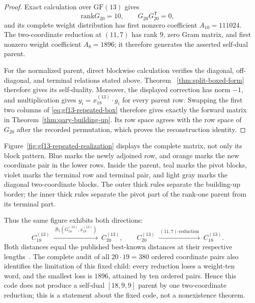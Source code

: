 \documentclass[12pt]{article}
\newcommand{\GF}[1]{\ensuremath{\mathrm{GF}(#1)}}
\newcommand{\rank}{\mathrm{rank}}
\begin{document}
\begin{proof}
Exact calculation over \(\GF{13}\) gives
\[
\rank G_{20}=10,\qquad G_{20}G_{20}^{\mathsf T}=0,
\]
and its complete weight distribution has first nonzero coefficient
\(A_{10}=111024\).  The two-coordinate reduction at \((11,7)\) has rank
\(9\), zero Gram matrix, and first nonzero weight coefficient
\(A_8=1896\); it therefore generates the asserted self-dual parent.

For the normalized parent, direct blockwise calculation verifies the
diagonal, off-diagonal, and terminal relations stated above.  Theorem~
\ref{thm:split-boxed-form} therefore gives its self-duality.  Moreover,
the displayed correction has norm \(-1\), and multiplication gives
\(y_i=x_{18}^{(13)}\cdot g_i\) for every parent row.  Swapping the first two
columns of \eqref{eq:gf13-repeated-box} therefore gives exactly the forward
matrix in Theorem~\ref{thm:qary-building-up}.  Its row space agrees with the
row space of \(G_{20}\) after the recorded permutation, which proves the
reconstruction identity.
\end{proof}

\begin{samepage}
Figure~\ref{fig:gf13-repeated-realization} displays the complete matrix, not
only its block pattern.  Blue marks the newly adjoined row, and orange marks
the new coordinate pair in the lower rows.  Inside the parent, teal marks
the pivot blocks, violet marks the terminal row and terminal pair, and light
gray marks the diagonal two-coordinate blocks.  The outer thick rules
separate the building-up border; the inner thick rules separate the pivot
part of the rank-one parent from its terminal part.

\begin{center}
\centering
{}
\label{fig:gf13-repeated-realization}
\end{center}
\end{samepage}

Thus the same figure exhibits both directions:
\[
C_{18}^{(13)}
\ \xrightarrow{\ \mathcal B_5(G_{18}^{(13)},x_{18}^{(13)})\ }\
C_{20}^{(13)},
\qquad
C_{20}^{(13)}
\ \xrightarrow{\ (11,7)\text{-reduction}\ }\
C_{18}^{(13)}.
\]
Both distances equal the published best-known distances at their respective
lengths~\cite{KimChoi2021,BetsumiyaEtAl}.  The complete audit of all
\(20\cdot19=380\) ordered coordinate
pairs also identifies the limitation of this fixed child: every reduction
loses a weight-ten word, and the smallest loss is \(1896\), attained by ten
ordered pairs.  Hence this code does not produce a self-dual
\([18,9,9]\) parent by one two-coordinate reduction; this is a statement
about the fixed code, not a nonexistence theorem.
\end{document}
